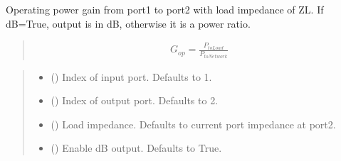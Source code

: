 \documentclass[letterpaper,10pt,english]{sphinxmanual}
\begin{document}
\begin{fulllineitems}
\begin{fulllineitems}
\label{\detokenize{touchstone:touchstone.spfile.gop2}}
\pysigstartsignatures
{}
\pysigstopsignatures
\sphinxAtStartPar
Operating power gain from port1 to port2 with load impedance of ZL. If dB=True, output is in dB, otherwise it is a power ratio.
\begin{quote}
\begin{equation*}
\begin{split}G_{op}=\frac{P_{toLoad}}{P_{toNetwork}}\end{split}
\end{equation*}\end{quote}
\begin{quote}\begin{description}
\begin{itemize}
\item {} 
\sphinxAtStartPar
{} (\sphinxstyleliteralemphasis{\sphinxupquote{, }}) \textendash{} Index of input port. Defaults to 1.

\item {} 
\sphinxAtStartPar
{} (\sphinxstyleliteralemphasis{\sphinxupquote{, }}) \textendash{} Index of output port. Defaults to 2.

\item {} 
\sphinxAtStartPar
{} (\sphinxstyleliteralemphasis{\sphinxupquote{, }}) \textendash{} Load impedance. Defaults to current port impedance at port2.

\item {} 
\sphinxAtStartPar
{} (\sphinxstyleliteralemphasis{\sphinxupquote{, }}) \textendash{} Enable dB output. Defaults to True.


\end{itemize}
\end{description}
\end{quote}
\end{fulllineitems}
\end{fulllineitems}
\end{document}
